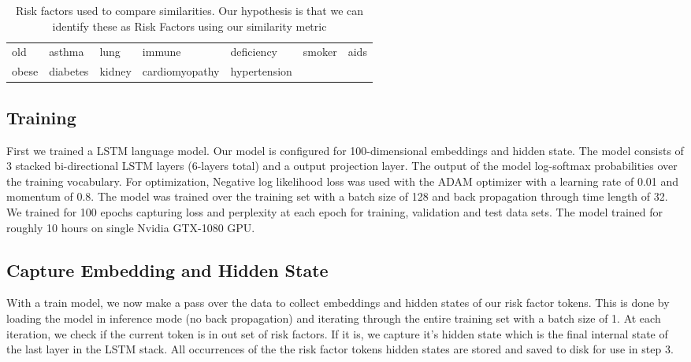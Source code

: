 \documentclass[11pt,a4paper]{article}
\begin{document}
\begin{table*}[h!]
    \centering
    \begin{tabular}{ l l l l l l l }
        \hline
        old & asthma & lung & immune & deficiency & smoker & aids \\
        obese & diabetes & kidney & cardiomyopathy & hypertension \\
        \hline
    \end{tabular}
    \caption{Risk factors used to compare similarities. Our hypothesis is that we can identify these as Risk Factors using our similarity metric}
    \label{tab:2}
\end{table*}

\subsection{Training}
First we trained a LSTM language model. Our model is configured for 100-dimensional embeddings and hidden state. The model consists of 3 stacked bi-directional LSTM layers (6-layers total) and a output projection layer. The output of the model log-softmax probabilities over the training vocabulary. For optimization, Negative log likelihood loss was used with the ADAM optimizer with a learning rate of 0.01 and momentum of 0.8. The model was trained over the training set with a batch size of 128 and back propagation through time length of 32. We trained for 100 epochs capturing loss and perplexity at each epoch for training, validation and test data sets. The model trained for roughly 10 hours on single Nvidia GTX-1080 GPU.

\subsection{Capture Embedding and Hidden State}
With a train model, we now make a pass over the data to collect embeddings and hidden states of our risk factor tokens. This is done by loading the model in inference mode (no back propagation) and iterating through the entire training set with a batch size of 1. At each iteration, we check if the current token is in out set of risk factors. If it is, we capture it's hidden state which is the final internal state of the last layer in the LSTM stack. All occurrences of the the risk factor tokens hidden states are stored and saved to disk for use in step 3.  
\end{document}
